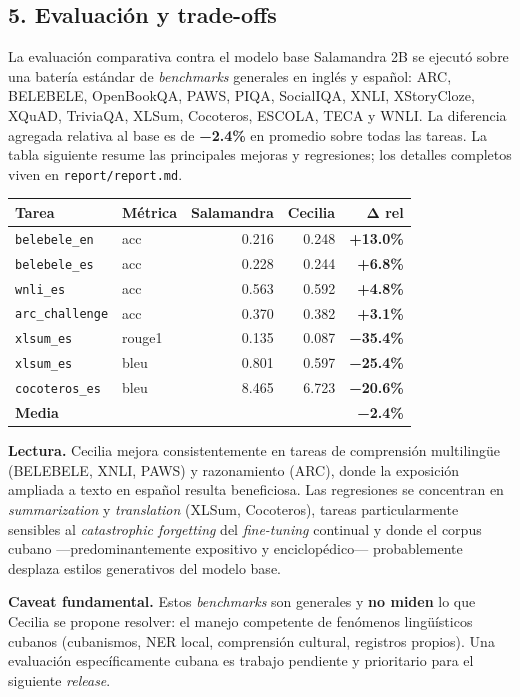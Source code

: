 \documentclass[
  spanish,
  letterpaper,
  DIV=11,
  numbers=noendperiod]{scrartcl}
\begin{document}
\subsection{5. Evaluación y
trade-offs}\label{evaluaciuxf3n-y-trade-offs}

La evaluación comparativa contra el modelo base Salamandra 2B se ejecutó
sobre una batería estándar de \emph{benchmarks} generales en inglés y
español: ARC, BELEBELE, OpenBookQA, PAWS, PIQA, SocialIQA, XNLI,
XStoryCloze, XQuAD, TriviaQA, XLSum, Cocoteros, ESCOLA, TECA y WNLI. La
diferencia agregada relativa al base es de \textbf{−2.4\%} en promedio
sobre todas las tareas. La tabla siguiente resume las principales
mejoras y regresiones; los detalles completos viven en
\texttt{report/report.md}.

\begin{longtable}[]{@{}llrrr@{}}
\toprule\noalign{}
Tarea & Métrica & Salamandra & Cecilia & Δ rel \\
\midrule\noalign{}
\endhead
\bottomrule\noalign{}
\endlastfoot
\texttt{belebele\_en} & acc & 0.216 & 0.248 & \textbf{+13.0\%} \\
\texttt{belebele\_es} & acc & 0.228 & 0.244 & \textbf{+6.8\%} \\
\texttt{wnli\_es} & acc & 0.563 & 0.592 & \textbf{+4.8\%} \\
\texttt{arc\_challenge} & acc & 0.370 & 0.382 & \textbf{+3.1\%} \\
\texttt{xlsum\_es} & rouge1 & 0.135 & 0.087 & \textbf{−35.4\%} \\
\texttt{xlsum\_es} & bleu & 0.801 & 0.597 & \textbf{−25.4\%} \\
\texttt{cocoteros\_es} & bleu & 8.465 & 6.723 & \textbf{−20.6\%} \\
\textbf{Media} & & & & \textbf{−2.4\%} \\
\end{longtable}

\textbf{Lectura.} Cecilia mejora consistentemente en tareas de
comprensión multilingüe (BELEBELE, XNLI, PAWS) y razonamiento (ARC),
donde la exposición ampliada a texto en español resulta beneficiosa. Las
regresiones se concentran en \emph{summarization} y \emph{translation}
(XLSum, Cocoteros), tareas particularmente sensibles al
\emph{catastrophic forgetting} del \emph{fine-tuning} continual y donde
el corpus cubano ---predominantemente expositivo y enciclopédico---
probablemente desplaza estilos generativos del modelo base.

\textbf{Caveat fundamental.} Estos \emph{benchmarks} son generales y
\textbf{no miden} lo que Cecilia se propone resolver: el manejo
competente de fenómenos lingüísticos cubanos (cubanismos, NER local,
comprensión cultural, registros propios). Una evaluación específicamente
cubana es trabajo pendiente y prioritario para el siguiente
\emph{release}.
\end{document}
